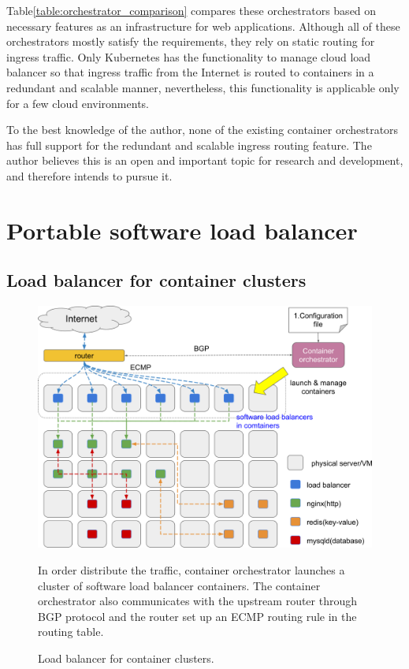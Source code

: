Table\ref{table:orchestrator_comparison} compares these orchestrators based on necessary features as an infrastructure for web applications.
Although all of these orchestrators mostly satisfy the requirements, they rely on static routing for ingress traffic.
Only Kubernetes has the functionality to manage cloud load balancer so that ingress traffic from the Internet is routed to containers in a redundant and scalable manner, nevertheless, this functionality is applicable only for a few cloud environments.

To the best knowledge of the author, none of the existing container orchestrators has full support for the redundant and scalable ingress routing feature.
The author believes this is an open and important topic for research and development, and therefore intends to pursue it.

\section{Portable software load balancer}

\subsection{Load balancer for container clusters}

\begin{figure}[h]
\begin{center}
\includegraphics[width=0.9\columnwidth]{Figs/cluster_of_container_loadbalancer}
\end{center}
\caption{
Load balancer for container clusters.
}
\centering\parbox[c]{0.9\columnwidth}{
In order distribute the traffic, container orchestrator launches a cluster of software load balancer containers. 
The container orchestrator also communicates with the upstream router through BGP protocol and the router set up an ECMP routing rule in the routing table.
}
\label{fig:cluster_of_container_loadbalancer}
\end{figure}

